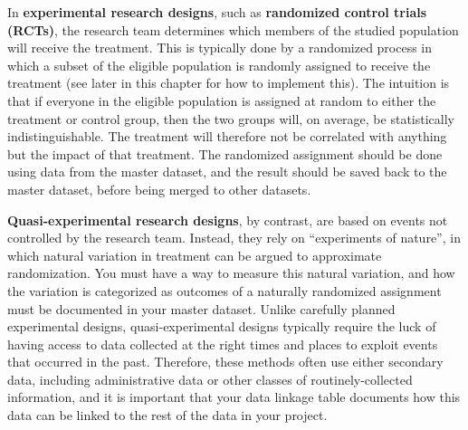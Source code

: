 
In \textbf{experimental research designs}, 
such as
\textbf{randomized control trials (RCTs)},
the research team determines which members
of the studied population will receive the treatment.
This is typically done by a randomized process
in which a subset of the eligible population
is randomly assigned to receive the treatment
(see later in this chapter for how to implement this).
The intuition is that if everyone in the eligible population
is assigned at random to either the treatment or control group,
then the two groups will, on average, be statistically indistinguishable.
The treatment will therefore not be correlated with anything
but the impact of that treatment.\cite{duflo2007using}
The randomized assignment should be done 
using data from the master dataset,
and the result should be saved back to the master dataset,
before being merged to other datasets.


\textbf{Quasi-experimental research designs},
by contrast, are based on events not controlled by the research team.
Instead, they rely on ``experiments of nature'',
in which natural variation in treatment can be argued to approximate randomization.
You must have a way to measure this natural variation,
and how the variation is categorized as outcomes of a naturally randomized assignment
must be documented in your master dataset.
Unlike carefully planned experimental designs,
quasi-experimental designs typically require the luck
of having access to data collected at the right times and places
to exploit events that occurred in the past.
Therefore, these methods often use either secondary data,
including administrative data or other classes of routinely-collected information,
and it is important that your data linkage table documents 
how this data can be linked to the rest of the data in your project.



